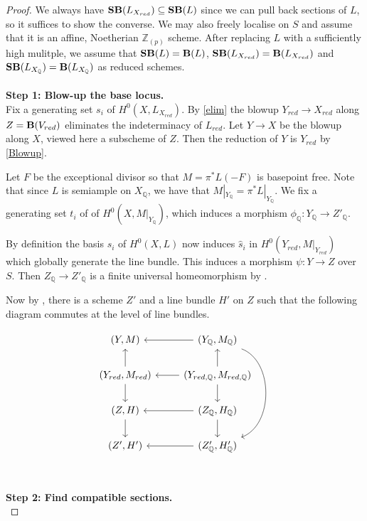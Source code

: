 \begin{proof}
	
	We always have $\mathbf{SB}(L_{X_{red}}) \subseteq \mathbf{SB}(L)$ since we can pull back sections of $L$, so it suffices to show the converse. We may also freely localise on $S$ and assume that it is an affine, Noetherian $\mathbb{Z}_{(p)}$ scheme. After replacing $L$ with a sufficiently high mulitple, we assume that $\mathbf{SB}(L)=\mathbf{B}(L)$, $\mathbf{SB}(L_{X_{red}})=\mathbf{B}(L_{X_{red}})$ and $\mathbf{SB}(L_{X_{\mathbb{Q}}})=\mathbf{B}(L_{X_{\mathbb{Q}}})$ as reduced schemes.\\
	\\
	\textbf{Step 1: Blow-up the base locus.}\\
	
	Fix a generating set $s_{i}$ of $H^{0}(X,L_{X_{red}})$.	By \autoref{elim} the blowup $Y_{red} \to X_{red}$ along $Z=\mathbf{B}(V_{red})$ eliminates the indeterminacy of $L_{red}$. Let $Y \to X$ be the blowup along $X$, viewed here a subscheme of $Z$. Then the reduction of $Y$ is $Y_{red}$ by \autoref{Blowup}.
	
	Let $F$ be the exceptional divisor so that $M = \pi^{*}L(-F)$ is basepoint free. Note that since $L$ is semiample on $X_{\mathbb{Q}}$, we have that $M|_{Y_{\mathbb{Q}}}=\pi^{*}L|_{Y_{\mathbb{Q}}}$. We fix a generating set $t_{i}$ of of $H^{0}(X,M|_{Y_{\mathbb{Q}}})$, which induces a morphism $\phi_{\mathbb{Q}}\colon Y_{\mathbb{Q}} \to Z'_{\mathbb{Q}}$. 
	
	By definition the basis $s_{i}$ of $H^{0}(X,L)$ now induces $\hat{s}_{i}$ in $H^{0}(Y_{red},M|_{Y_{red}})$ which globally generate the line bundle. This induces a morphism $\psi: Y \to Z$ over $S$. Then $Z_{\mathbb{Q}} \to Z'_{\mathbb{Q}}$ is a finite universal homeomorphism by \cite[Tag 02OG]{stacks-project}. 
	
	Now by \cite[Theorem 1.7, Corollary 4.20 and Lemma 2.20]{witaszek2020keels}, there is a scheme $Z'$ and a line bundle $H'$ on $Z$ such that the following diagram commutes at the level of line bundles.
	
	\[\begin{tikzcd}
	{(Y,M)}                                 & {(Y_{\mathbb{Q}},M_{\mathbb{Q}})} \arrow[ddd, bend left=70] \arrow[l]     \\
	{(Y_{red},M_{red})} \arrow[d] \arrow[u] & {(Y_{red, \mathbb{Q}},M_{red, \mathbb{Q}})} \arrow[d] \arrow[u] \arrow[l] \\
	{(Z,H)} \arrow[d]                       & {(Z_{\mathbb{Q}},H_{\mathbb{Q}})} \arrow[l] \arrow[d]                    \\
	{(Z',H')}                               & {(Z'_{\mathbb{Q}},H'_{\mathbb{Q}})} \arrow[l]                            
	\end{tikzcd}\]\\
	\\
	\textbf{Step 2: Find compatible sections.}\\
	

\end{proof}

